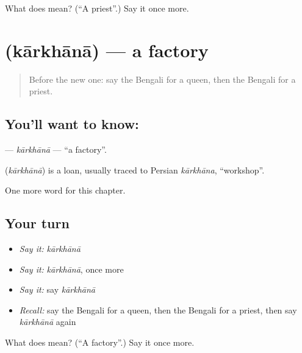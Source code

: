 \begin{tcolorbox}[breakable,colback=teal!4,colframe=teal!35!black,title={Before you move on}]
What does  mean? (\textquotedblleft{}A priest\textquotedblright{}.) Say it once more.
\end{tcolorbox}
\section[\texorpdfstring{\bn{কারখানা} (kārkhānā)}{কারখানা (kārkhānā)}]{ (kārkhānā) — a factory}

\label{lesson:BN-C127-karkhana}



\begin{quote}
Before the new one: say the Bengali for a queen, then the Bengali for a priest.
\end{quote}

\subsection*{You'll want to know: }
\textbf{} — \emph{kārkhānā} — \textquotedblleft{}a factory\textquotedblright{}.

\begin{cousinweb}
\textbf{} (\emph{kārkhānā}) is a loan, usually traced to Persian \emph{kārkhāna}, \textquotedblleft{}workshop\textquotedblright{}.
\end{cousinweb}

\begin{grammarlens}[title={What you've built}]
One more word for this chapter.
\end{grammarlens}

\subsection*{Your turn}
\begin{itemize}
\raggedright
  \item \emph{Say it:} \emph{kārkhānā}
  \item \emph{Say it:} \emph{kārkhānā}, once more
  \item \emph{Say it:} say \emph{kārkhānā}
  \item \emph{Recall:} say the Bengali for a queen, then the Bengali for a priest, then say \emph{kārkhānā} again
\end{itemize}

\begin{tcolorbox}[breakable,colback=teal!4,colframe=teal!35!black,title={Before you move on}]
What does  mean? (\textquotedblleft{}A factory\textquotedblright{}.) Say it once more.
\end{tcolorbox}
